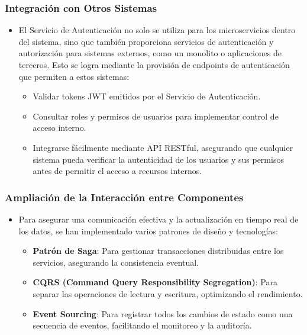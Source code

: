 \documentclass{article}
\begin{document}
\subsubsection{Integración con Otros Sistemas}
\begin{itemize}
    \item El Servicio de Autenticación no solo se utiliza para los microservicios dentro del sistema, sino que también proporciona servicios de autenticación y autorización para sistemas externos, como un monolito o aplicaciones de terceros. Esto se logra mediante la provisión de endpoints de autenticación que permiten a estos sistemas:
          \begin{itemize}
              \item Validar tokens JWT emitidos por el Servicio de Autenticación.
              \item Consultar roles y permisos de usuarios para implementar control de acceso interno.
              \item Integrarse fácilmente mediante API RESTful, asegurando que cualquier sistema pueda verificar la autenticidad de los usuarios y sus permisos antes de permitir el acceso a recursos internos.
          \end{itemize}
\end{itemize}

\subsubsection{Ampliación de la Interacción entre Componentes}
\begin{itemize}
    \item Para asegurar una comunicación efectiva y la actualización en tiempo real de los datos, se han implementado varios patrones de diseño y tecnologías:
          \begin{itemize}
              \item \textbf{Patrón de Saga}: Para gestionar transacciones distribuidas entre los servicios, asegurando la consistencia eventual.
              \item \textbf{CQRS (Command Query Responsibility Segregation)}: Para separar las operaciones de lectura y escritura, optimizando el rendimiento.
              \item \textbf{Event Sourcing}: Para registrar todos los cambios de estado como una secuencia de eventos, facilitando el monitoreo y la auditoría.
          \end{itemize}
\end{itemize}
\end{document}
